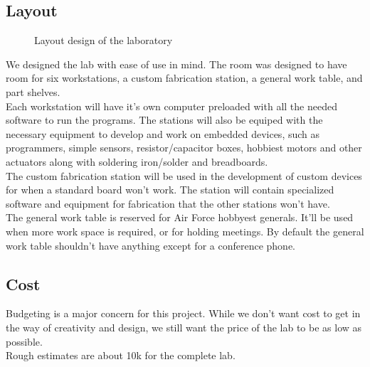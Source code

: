 \documentclass[12pt]{article}
\begin{document}
\subsection{Layout}

\begin{figure}[h!]
  \centering
  \label{fig:layout}
  \caption{Layout design of the laboratory}
\end{figure}
\noindent
We designed the lab with ease of use in mind. The room was designed to have room for six workstations, a custom fabrication station, a general work table, and part shelves.  \\

\noindent
Each workstation will have it's own computer preloaded with all the needed software to run the programs. The stations will also be equiped with the necessary equipment to develop and work on embedded devices, such as programmers, simple sensors, resistor/capacitor boxes, hobbiest motors and other actuators along with soldering iron/solder and breadboards. \\

\noindent
The custom fabrication station will be used in the development of custom devices for when a standard board won't work. The station will contain specialized software and equipment for fabrication that the other stations won't have.\\

\noindent
The general work table is reserved for Air Force hobbyest generals. It'll be used when more work space is required, or for holding meetings. By default the general work table shouldn't have anything except for a conference phone.

\subsection{Cost}
\noindent
Budgeting is a major concern for this project. While we don't want cost to get in the way of creativity and design, we still want the price of the lab to be as low as possible. \\

\noindent
Rough estimates are about 10k for the complete lab. 
\end{document}
